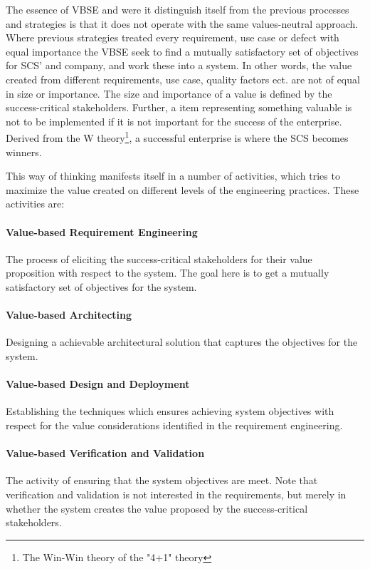 \documentclass{sig-alternate}
\begin{document}
The essence of VBSE and were it distinguish itself from the previous processes and strategies is that it does not operate with the same values-neutral approach. Where previous strategies treated every requirement, use case or defect with equal importance the VBSE seek to find a mutually satisfactory set of objectives for SCS' and company, and work these into a system. In other words, the value created from different requirements, use case, quality factors ect. are not of equal in size or importance. The size and importance of a value is defined by the success-critical stakeholders. Further, a item representing something valuable is not to be implemented if it is not important for the success of the enterprise. Derived from the W theory\footnote{The Win-Win theory of the "4+1" theory}, a successful enterprise is where the SCS becomes winners. 

This way of thinking manifests itself in a number of activities, which tries to maximize the value created on different levels of the engineering practices. These activities are:

\paragraph*{Value-based Requirement Engineering} The process of eliciting the success-critical stakeholders for their value proposition with respect to the system. The goal here is to get a mutually satisfactory set of objectives for the system.
\paragraph*{Value-based Architecting} Designing a achievable architectural solution that captures the objectives for the system. 
\paragraph*{Value-based Design and Deployment} Establishing the techniques which ensures achieving system objectives with respect for the value considerations identified in the requirement engineering.
\paragraph*{Value-based Verification and Validation} The activity of ensuring that the system objectives are meet. Note that verification and validation is not interested in the requirements, but merely in whether the system creates the value proposed by the success-critical stakeholders.  
\end{document}
